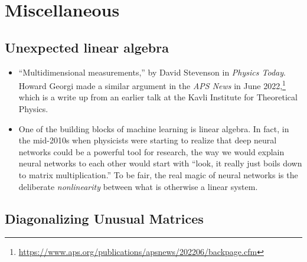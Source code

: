 \documentclass[12pt, oneside]{report}    %
\let\oldsection\section
\def\section{%
  \setcounter{sidenote}{1}%
  \oldsection
}
\begin{document}



\chapter{Miscellaneous}

\section{Unexpected linear algebra}

\begin{itemize}
    \item ``Multidimensional measurements,'' by David Stevenson in \emph{Physics Today}\autocite{10.1063/pt.ogyk.yscx}. Howard Georgi made a similar argument in the \emph{APS News} in June 2022,\footnote{\url{https://www.aps.org/publications/apsnews/202206/backpage.cfm}} which is a write up from an earlier talk at the Kavli Institute for Theoretical Physics\autocite{Georgi:2022jfv}.

    \item One of the building blocks of machine learning is linear algebra. In fact, in the mid-2010s when physicists were starting to realize that deep neural networks could be a powerful tool for research, the way we would explain neural networks to each other would start with ``look, it really just boils down to matrix multiplication.'' To be fair, the real magic of neural networks is the deliberate \emph{nonlinearity} between what is otherwise a linear system. 

\end{itemize}

\section{Diagonalizing Unusual Matrices}

\printindex

% 
\end{document}
